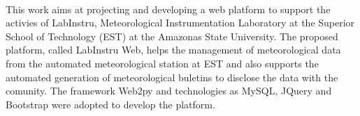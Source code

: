 \ \ \\[2cm]
This work aims at projecting and developing a web platform to support the activies of LabInstru, Meteorological Instrumentation Laboratory at the Superior School of Technology (EST) at the Amazonas State University. The proposed platform, called LabInstru Web, helps the management of meteorological data from the automated meteorological station at EST and also supports the automated generation of meteorological buletins to disclose the data with the comunity. The framework Web2py and technologies as MySQL, JQuery and Bootstrap were adopted to develop the platform.
